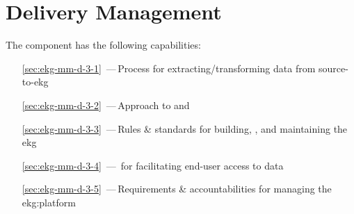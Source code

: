 \chapter{ Delivery Management}\label{ch:ekg-mm-d-3}

The  component has the following capabilities:

\begin{itemize}[leftmargin=.5in]
  \item [\ref{sec:ekg-mm-d-3-1}] \,---\,Process for extracting/transforming data from source-to-\gls{ekg}
  \item [\ref{sec:ekg-mm-d-3-2}] \,---\,Approach to  and 
  \item [\ref{sec:ekg-mm-d-3-3}] \,---\,Rules \& standards for building, , and maintaining the \gls{ekg}
  \item [\ref{sec:ekg-mm-d-3-4}] \,---\, for facilitating end-user access to data
  \item [\ref{sec:ekg-mm-d-3-5}] \,---\,Requirements \& accountabilities for managing the \gls{ekg:platform}
\end{itemize}







